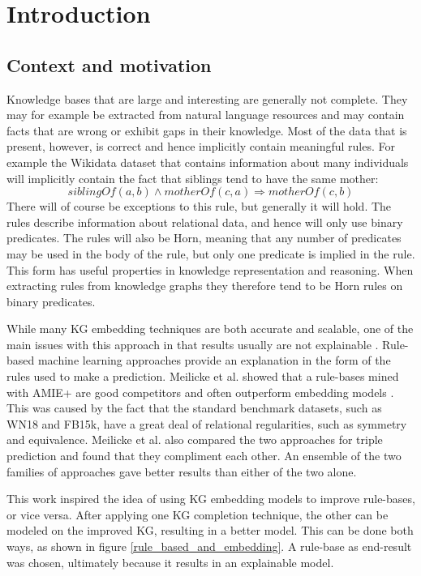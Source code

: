 \chapter{Introduction}
\section{Context and motivation}


Knowledge bases that are large and interesting are generally not complete. They may for example be extracted from natural language resources and may contain facts that are wrong or exhibit gaps in their knowledge. Most of the data that is present, however, is correct and hence implicitly contain meaningful rules. For example the Wikidata dataset that contains information about many individuals will implicitly contain the fact that siblings tend to have the same mother:
\[siblingOf(a, b) \wedge motherOf(c, a) \Rightarrow motherOf(c, b)\]
There will of course be exceptions to this rule, but generally it will hold. The rules describe information about relational data, and hence will only use binary predicates. The rules will also be Horn, meaning that any number of predicates may be used in the body of the rule, but only one predicate is implied in the rule. This form has useful properties in knowledge representation and reasoning. When extracting rules from knowledge graphs they therefore tend to be Horn rules on binary predicates.

While many KG embedding techniques are both accurate and scalable, one of the main issues with this approach in that results usually are not explainable \cite{bonatti2019knowledge}. Rule-based machine learning approaches provide an explanation in the form of the rules used to make a prediction.  Meilicke et al. showed that a rule-bases mined with AMIE+ are good competitors and often outperform embedding models \cite{ensemble}. This was caused by the fact that the standard benchmark datasets, such as WN18 and FB15k,  have a great deal of relational regularities, such as symmetry and equivalence. Meilicke et al. also compared the two approaches for triple prediction and found that they compliment each other. An ensemble of the two families of approaches gave better results than either of the two alone.

This work inspired the idea of using KG embedding models to improve rule-bases, or vice versa. After applying one KG completion technique, the other can be modeled on the improved KG, resulting in a better model. This can be done both ways, as shown in figure \ref{rule_based_and_embedding}. A rule-base as end-result was chosen, ultimately because it results in an explainable model. 

